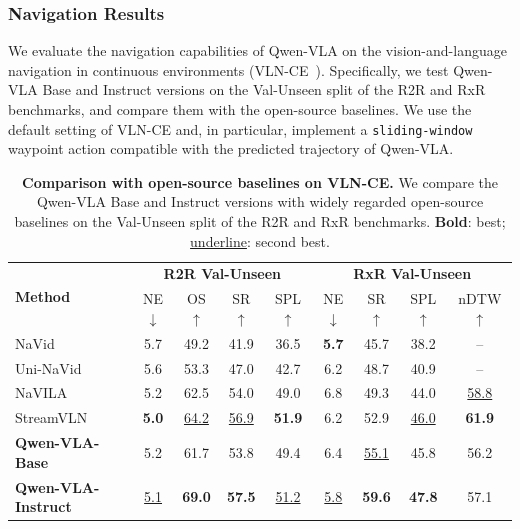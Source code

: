 \documentclass{llmxive}
\begin{document}
\subsubsection{Navigation Results}

We evaluate the navigation capabilities of Qwen-VLA on the vision-and-language navigation in continuous environments (VLN-CE~\citep{krantz_vlnce_2020,ku2020room}). Specifically, we test Qwen-VLA Base and Instruct versions on the Val-Unseen split of the R2R and RxR benchmarks, and compare them with the open-source baselines. We use the default setting of VLN-CE and, in particular, implement a \texttt{sliding-window} waypoint action compatible with the predicted trajectory of Qwen-VLA.



\begin{table}[htbp]
  \centering
  \small
  \setlength{\tabcolsep}{3.5pt}
  \begin{tabular}{lcccc|cccc}
    \toprule
    \multirow{2}{*}{\textbf{Method}} &
      \multicolumn{4}{c|}{\textbf{R2R Val-Unseen}} &
      \multicolumn{4}{c}{\textbf{RxR Val-Unseen}} \\
    & NE$\downarrow$ & OS$\uparrow$ & SR$\uparrow$ & SPL$\uparrow$
    & NE$\downarrow$ & SR$\uparrow$ & SPL$\uparrow$ & nDTW$\uparrow$ \\
    \midrule
    NaVid~\citep{zhang2024navid}                & 5.7 & 49.2 & 41.9 & 36.5 & \textbf{5.7} & 45.7 & 38.2 & -- \\
    Uni-NaVid~\citep{zhang2024uni}              & 5.6 & 53.3 & 47.0 & 42.7 & 6.2 & 48.7 & 40.9 & -- \\
    NaVILA~\citep{cheng2024navila}              & 5.2 & 62.5 & 54.0 & 49.0 & 6.8 & 49.3 & 44.0 & \underline{58.8} \\
    StreamVLN~\citep{wei2025streamvln}          & \textbf{5.0} & \underline{64.2} & \underline{56.9} & \textbf{51.9} & 6.2 & 52.9 & \underline{46.0} & \textbf{61.9} \\
    
    \midrule
    \textbf{Qwen-VLA-Base}                        & 5.2 & 61.7 & 53.8 & 49.4 & 6.4 & \underline{55.1} & 45.8 & 56.2 \\
    \textbf{Qwen-VLA-Instruct}                        & \underline{5.1} & \textbf{69.0} & \textbf{57.5} & \underline{51.2} & \underline{5.8} & \textbf{59.6} & \textbf{47.8} & 57.1 \\
    \bottomrule
  \end{tabular}
\caption{\textbf{Comparison with open-source baselines on VLN-CE.} We compare the Qwen-VLA Base and Instruct versions with widely regarded open-source baselines on the Val-Unseen split of the R2R and RxR benchmarks. \textbf{Bold}: best; \underline{underline}: second best.}
\label{tab:sub_vlnce}
\end{table}
\end{document}
